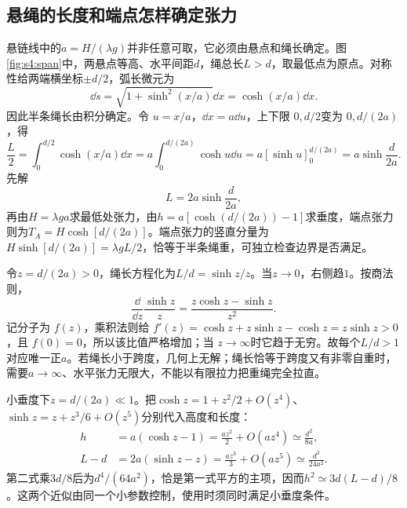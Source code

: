 \subsection{悬绳的长度和端点怎样确定张力}
悬链线中的$a=H/(\lambda g)$并非任意可取，它必须由悬点和绳长确定。图\ref{fig:s4:span}中，两悬点等高、水平间距$d$，绳总长$L>d$，取最低点为原点。对称性给两端横坐标$\pm d/2$，弧长微元为
\[
\dd s=\sqrt{1+\sinh^2(x/a)}\dd x
=\cosh(x/a)\dd x.
\]
因此半条绳长由积分确定。令 $u=x/a$，$\dd x=a\dd u$，上下限 $0,d/2$变为 $0,d/(2a)$，得
\[\frac L2=\int_0^{d/2}\cosh(x/a)\dd x
 =a\int_0^{d/(2a)}\cosh u\dd u
 =a[\sinh u]_0^{d/(2a)}=a\sinh\frac d{2a}.\]
先解
\[
L=2a\sinh\frac d{2a},
\]
再由$H=\lambda ga$求最低处张力，由$h=a[\cosh(d/(2a))-1]$求垂度，端点张力则为$T_A=H\cosh[d/(2a)]$。端点张力的竖直分量为$H\sinh[d/(2a)]=\lambda gL/2$，恰等于半条绳重，可独立检查边界是否满足。

令$z=d/(2a)>0$，绳长方程化为$L/d=\sinh z/z$。当$z\to0$，右侧趋$1$。按商法则，
\[\frac{\dd}{\dd z}\frac{\sinh z}{z}
 =\frac{z\cosh z-\sinh z}{z^2}.\]
记分子为 $f(z)$，乘积法则给 $f'(z)=\cosh z+z\sinh z-\cosh z=z\sinh z>0$，且 $f(0)=0$，所以该比值严格增加；当 $z\to\infty$时它趋于无穷。故每个$L/d>1$对应唯一正$a$。若绳长小于跨度，几何上无解；绳长恰等于跨度又有非零自重时，需要$a\to\infty$、水平张力无限大，不能以有限拉力把重绳完全拉直。

小垂度下$z=d/(2a)\ll1$。把$\cosh z=1+z^2/2+O(z^4)$、$\sinh z=z+z^3/6+O(z^5)$分别代入高度和长度：
\begin{align*}
h&=a(\cosh z-1)=\frac{az^2}{2}+O(az^4)
\simeq\frac{d^2}{8a},\\
L-d&=2a(\sinh z-z)=\frac{az^3}{3}+O(az^5)
\simeq\frac{d^3}{24a^2}.
\end{align*}
第二式乘$3d/8$后为$d^4/(64a^2)$，恰是第一式平方的主项，因而$h^2\simeq3d(L-d)/8$。这两个近似由同一个小参数控制，使用时须同时满足小垂度条件。

